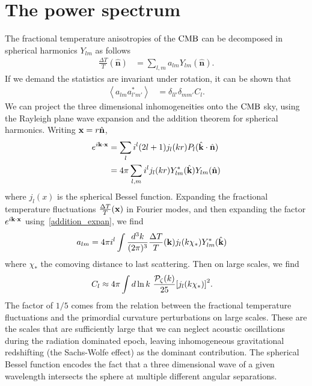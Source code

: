     \section{The power spectrum}\label{sec:power_spec_estimator}
    The fractional temperature anisotropies of the $\text{CMB}$ can be decomposed in spherical
    harmonics $Y_{lm}$ as follows
    \begin{align}
        \frac{\Delta T}{T}(\hat{\mathbf{n}}) &= \sum_{l,m} a_{lm}Y_{lm}(\hat{\mathbf{n}}).
    \end{align}
    If we demand the statistics are invariant under rotation, it can be shown that
    \begin{align}
        \left<a_{lm}a^*_{l'm'}\right> &= \delta_{ll'}\delta_{mm'}C_l.
    \end{align}
    We can project the three dimensional inhomogeneities onto the $\text{CMB}$ sky,
    using the Rayleigh plane wave expansion and the addition theorem
    for spherical harmonics. Writing $\mathbf{x}=r\hat{\mathbf{n}}$,
    \begin{align}
        e^{i\mathbf{k}\cdot\mathbf{x}} &= \sum_l i^l(2l+1)j_l(kr)P_l(\hat{\mathbf{k}}\cdot\hat{\mathbf{n}})\\
                    &= 4\pi\sum_{l,m}i^l j_l(kr)Y^*_{lm}(\hat{\mathbf{k}})Y_{lm}(\hat{\mathbf{n}})\label{addition_expan}
    \end{align}
    where $j_l(x)$ is the spherical Bessel function.
    Expanding the fractional temperature fluctuations
    $\frac{\Delta T}{T}(\mathbf{x})$ in Fourier modes,
    and then expanding the factor $e^{i\mathbf{k}\cdot\mathbf{x}}$ using~\eqref{addition_expan},
    we find
    \begin{align}
        a_{lm} &= 4\pi i^l\int\frac{d^3k}{(2\pi)^3}\frac{\Delta T}{T}(\mathbf{k})j_l(k\chi_*)Y^*_{lm}(\hat{\mathbf{k}})
    \end{align}
    where $\chi_*$ the comoving distance to last scattering.
    Then on large scales, we find
    \begin{align}\label{sachs_cl_example}
        C_l &\approx 4\pi\int d\ln k~\frac{\mathcal{P}_{\mathcal{\zeta}}(k)}{25}{\left[
            j_l(k\chi_*)
            \right]}^2.
    \end{align}
    The factor of $1/5$ comes from the relation between the fractional temperature
    fluctuations and the primordial curvature perturbations on large scales. These are the scales
    that are sufficiently large that we can neglect acoustic oscillations during the
    radiation dominated epoch, leaving inhomogeneous gravitational redshifting
    (the Sachs-Wolfe effect) as the dominant contribution.
    The spherical Bessel function encodes the fact that a three dimensional
    wave of a given wavelength intersects the sphere at multiple different angular separations.



